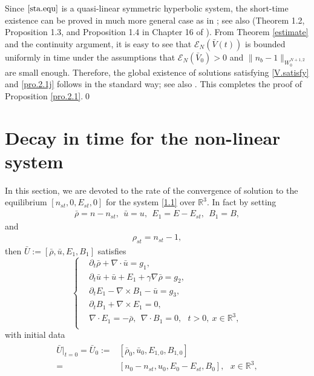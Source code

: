 \documentclass[11pt]{amsart}
\numberwithin{equation}{section}
\begin{document}
Since $\eqref{sta.equ}$ is a quasi-linear symmetric hyperbolic
system, the short-time existence can be proved in much more general
case as in \cite{Kato}; see also (Theorem 1.2, Proposition 1.3, and
Proposition 1.4 in Chapter 16 of \cite{Taylor}). From Theorem
\ref{estimate} and the continuity argument, it is easy to see that $
\mathcal {E}_{N}(\bar{V}(t)) $ is bounded uniformly in time under
the assumptions that $\mathcal {E}_{N}(\bar{V}_{0})>0$ and
$\|n_{b}-1\|_{W_{0}^{N+1,2}}$ are small enough. Therefore, the
global existence of solutions satisfying \eqref{V.satisfy} and
\eqref{pro.2.1j} follows in the standard way; see also \cite{Duan}.
This completes the proof of Proposition \ref{pro.2.1}.\qed

\vspace{5mm}

\section{Decay in time for the non-linear system}\label{sec4}
In this section, we are devoted to the rate of the convergence of
solution to the equilibrium $[n_{st},0,E_{st},0]$ for the system
\eqref{1.1} over $\mathbb{R}^3$. In fact by setting
\begin{eqnarray*}
\bar{\rho}=n-n_{st},\ \ \bar{u}=u,\ \ E_{1}=E-E_{st},\ \ B_{1}=B,
\end{eqnarray*}
and
\begin{eqnarray*}
\rho_{st}=n_{st}-1,
\end{eqnarray*}
then $\bar{U}:=[\bar{\rho},\bar{u},E_{1},B_{1}]$ satisfies
\begin{equation}\label{rhost}
\left\{
  \begin{aligned}
  &\partial_t \bar{\rho}+\nabla\cdot \bar{u}=g_{1} ,\\
  &\partial_t \bar{u}+\bar{u} + E_{1} +\gamma \nabla\bar{\rho}=g_{2},
  \\
  &\partial_t E_{1}-\nabla\times B_{1}-\bar{u}=g_{3},\\
  &\partial_t B_{1}+\nabla \times E_{1}=0,\\
  &\nabla \cdot E_{1}=-\bar{\rho}, \ \  \nabla \cdot B_{1}=0, \ \ \ t>0,\ x\in\mathbb{R}^{3},\\
\end{aligned}\right.
\end{equation}
with initial data
\begin{eqnarray}\label{rhosti}
\begin{aligned}
\bar{U}|_{t=0}=\bar{U}_{0}:=&[\bar{\rho}_{0},\bar{u}_{0},E_{1,0},B_{1,0}]\\
 =&[n_0-n_{st},u_0,E_{0}-E_{st},B_0], \ \
\ x\in\mathbb{R}^{3},
\end{aligned}
\end{eqnarray}
\end{document}
